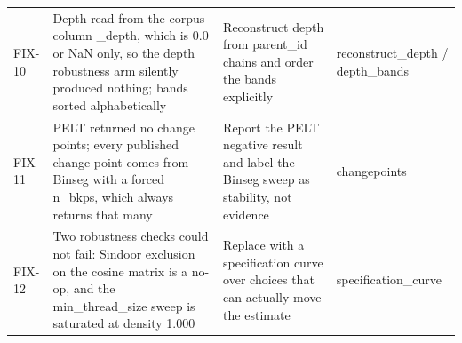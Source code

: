 \begin{table}
\begin{tabular}{llll}
FIX-10 & Depth read from the corpus column \_depth, which is 0.0 or NaN only, so the depth robustness arm silently produced nothing; bands sorted alphabetically & Reconstruct depth from parent\_id chains and order the bands explicitly & reconstruct\_depth / depth\_bands \\
FIX-11 & PELT returned no change points; every published change point comes from Binseg with a forced n\_bkps, which always returns that many & Report the PELT negative result and label the Binseg sweep as stability, not evidence & changepoints \\
FIX-12 & Two robustness checks could not fail: Sindoor exclusion on the cosine matrix is a no-op, and the min\_thread\_size sweep is saturated at density 1.000 & Replace with a specification curve over choices that can actually move the estimate & specification\_curve \\
\bottomrule
\end{tabular}
\end{table}
